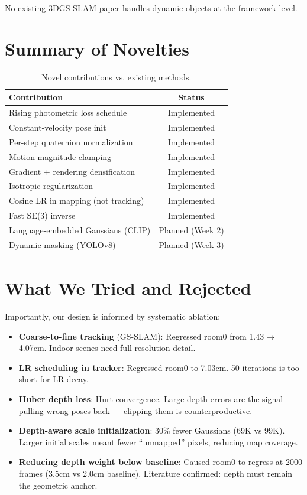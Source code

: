 \documentclass[10pt,twocolumn]{article}
\begin{document}
No existing 3DGS SLAM paper handles dynamic objects at the framework level.

\section{Summary of Novelties}

\begin{table}[h]
\centering
\caption{Novel contributions vs. existing methods.}
\small
\begin{tabular}{@{}lc@{}}
\toprule
\textbf{Contribution} & \textbf{Status} \\
\midrule
Rising photometric loss schedule & Implemented \\
Constant-velocity pose init & Implemented \\
Per-step quaternion normalization & Implemented \\
Motion magnitude clamping & Implemented \\
Gradient + rendering densification & Implemented \\
Isotropic regularization & Implemented \\
Cosine LR in mapping (not tracking) & Implemented \\
Fast SE(3) inverse & Implemented \\
Language-embedded Gaussians (CLIP) & Planned (Week 2) \\
Dynamic masking (YOLOv8) & Planned (Week 3) \\
\bottomrule
\end{tabular}
\end{table}

\section{What We Tried and Rejected}

Importantly, our design is informed by systematic ablation:
\begin{itemize}[itemsep=2pt]
\item \textbf{Coarse-to-fine tracking} (GS-SLAM): Regressed room0 from 1.43$\rightarrow$4.07cm. Indoor scenes need full-resolution detail.
\item \textbf{LR scheduling in tracker}: Regressed room0 to 7.03cm. 50 iterations is too short for LR decay.
\item \textbf{Huber depth loss}: Hurt convergence. Large depth errors are the signal pulling wrong poses back --- clipping them is counterproductive.
\item \textbf{Depth-aware scale initialization}: 30\% fewer Gaussians (69K vs 99K). Larger initial scales meant fewer ``unmapped'' pixels, reducing map coverage.
\item \textbf{Reducing depth weight below baseline}: Caused room0 to regress at 2000 frames (3.5cm vs 2.0cm baseline). Literature confirmed: depth must remain the geometric anchor.
\end{itemize}
\end{document}
